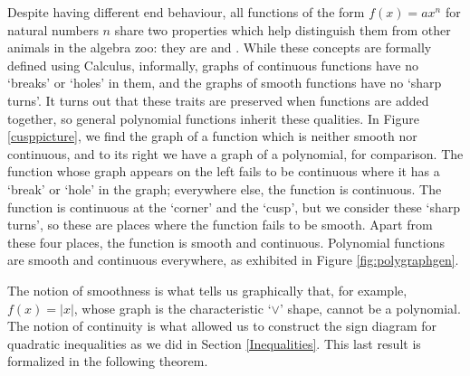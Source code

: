 \smallskip

Despite having different end behaviour, all functions of the form $f(x) = ax^{n}$ for natural numbers $n$ share two properties which help distinguish them from other animals in the algebra zoo:  they  are  and .  While these concepts are formally defined using Calculus, informally, graphs of continuous functions have no `breaks' or `holes' in them, and the graphs of smooth functions have no `sharp turns'.  It turns out that these traits are preserved when functions are added together, so general polynomial functions inherit these qualities.  In Figure \ref{cusppicture}, we find the graph of a function which is neither smooth nor continuous, and to its right we have a graph of a polynomial, for comparison.  The function whose graph appears on the left fails to be continuous where it has a `break' or `hole' in the graph;  everywhere else, the function is continuous.  The function is continuous at the `corner' and the `cusp', but we consider these `sharp turns', so these are places where the function fails to be smooth.  Apart from these four places, the function is smooth and continuous.  Polynomial functions are smooth and continuous everywhere, as exhibited in Figure \ref{fig:polygraphgen}.






The notion of smoothness is what tells us graphically that, for example, $f(x) = |x|$, whose graph is the characteristic `$\vee$' shape, cannot be a polynomial.  The notion of continuity is what allowed us to construct the sign diagram for quadratic inequalities as we did in Section \ref{Inequalities}.  This last result is formalized in the following theorem.
  
\smallskip


